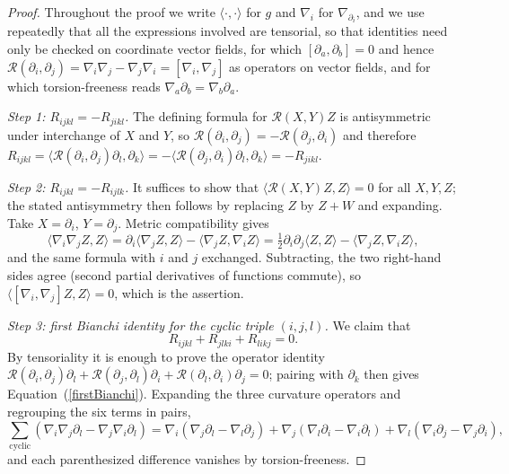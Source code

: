 \begin{proof}
\leanok
Throughout the proof we write $\langle\cdot,\cdot\rangle$ for $g$
and $\nabla_i$ for $\nabla_{\partial_i}$, and we use repeatedly that
all the expressions involved are tensorial, so that identities need
only be checked on coordinate vector fields, for which
$[\partial_a,\partial_b]=0$ and hence ${\mathcal
R}(\partial_i,\partial_j)=\nabla_i\nabla_j-\nabla_j\nabla_i
=[\nabla_i,\nabla_j]$ as operators on vector fields, and for which
torsion-freeness reads $\nabla_a\partial_b=\nabla_b\partial_a$.

\emph{Step 1: $R_{ijkl}=-R_{jikl}$.} The defining formula for
${\mathcal R}(X,Y)Z$ is antisymmetric under interchange of $X$ and
$Y$, so ${\mathcal R}(\partial_i,\partial_j)=-{\mathcal
R}(\partial_j,\partial_i)$ and therefore
$R_{ijkl}=\langle{\mathcal
R}(\partial_i,\partial_j)\partial_l,\partial_k\rangle
=-\langle{\mathcal
R}(\partial_j,\partial_i)\partial_l,\partial_k\rangle=-R_{jikl}$.

\emph{Step 2: $R_{ijkl}=-R_{ijlk}$.} It suffices to show that
$\langle {\mathcal R}(X,Y)Z,Z\rangle=0$ for all $X,Y,Z$; the stated
antisymmetry then follows by replacing $Z$ by $Z+W$ and expanding.
Take $X=\partial_i$, $Y=\partial_j$. Metric compatibility gives
$$\langle\nabla_i\nabla_jZ,Z\rangle
=\partial_i\langle\nabla_jZ,Z\rangle-\langle\nabla_jZ,\nabla_iZ\rangle
=\tfrac{1}{2}\partial_i\partial_j\langle
Z,Z\rangle-\langle\nabla_jZ,\nabla_iZ\rangle,$$ and the same formula
with $i$ and $j$ exchanged. Subtracting, the two right-hand sides
agree (second partial derivatives of functions commute), so
$\langle[\nabla_i,\nabla_j]Z,Z\rangle=0$, which is the assertion.

\emph{Step 3: first Bianchi identity for the cyclic triple
$(i,j,l)$.} We claim that
\begin{equation}\label{firstBianchi}
R_{ijkl}+R_{jlki}+R_{likj}=0.
\end{equation}
By tensoriality it is enough to prove the operator identity
${\mathcal R}(\partial_i,\partial_j)\partial_l+{\mathcal
R}(\partial_j,\partial_l)\partial_i+{\mathcal
R}(\partial_l,\partial_i)\partial_j=0$; pairing with $\partial_k$
then gives Equation~(\ref{firstBianchi}). Expanding the three
curvature operators and regrouping the six terms in pairs,
$$\sum_{\mathrm{cyclic}}\left(\nabla_i\nabla_j\partial_l
-\nabla_j\nabla_i\partial_l\right)
=\nabla_i\left(\nabla_j\partial_l-\nabla_l\partial_j\right)
+\nabla_j\left(\nabla_l\partial_i-\nabla_i\partial_l\right)
+\nabla_l\left(\nabla_i\partial_j-\nabla_j\partial_i\right),$$
and each parenthesized difference vanishes by torsion-freeness.


\end{proof}
